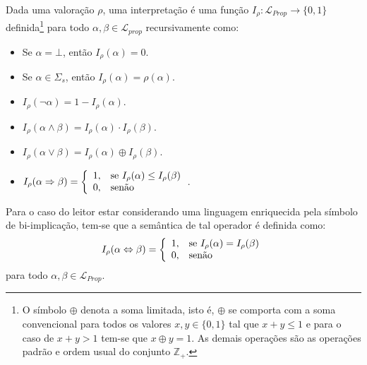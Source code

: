 \begin{definition}[Interpretação]\label{def:interpretacat}
   Dada uma valoração $\rho$, uma interpretação é uma função $I_\rho : \mathcal{L}_{Prop} \rightarrow \{0,1\}$ definida\footnote{O símbolo $\oplus$ denota a soma limitada, isto é, $\oplus$ se comporta com a soma convencional para todos os valores $x, y \in \{0,1\}$ tal que $x + y \leq 1$ e para o caso de $x + y > 1$ tem-se que $x \oplus y = 1$. As demais operações são as operações padrão e ordem usual do conjunto $\mathbb{Z}_+$.} para todo $\alpha, \beta \in \mathcal{L}_{prop}$ recursivamente como:
   \begin{itemize}
        \item Se $\alpha = \bot$, então $I_\rho(\alpha) = 0$.
        \item Se $\alpha \in \Sigma_s$, então $I_\rho(\alpha) = \rho(\alpha)$.
        \item $I_\rho(\neg \alpha) = 1 - I_\rho(\alpha)$.
        \item $I_\rho(\alpha \land \beta) = I_\rho(\alpha) \cdot I_\rho(\beta)$.
        \item $I_\rho(\alpha \lor \beta) = I_\rho(\alpha) \oplus I_\rho(\beta)$.
        \item $I_\rho(\alpha \Rightarrow \beta) = \left\{\begin{array}{rl}	1, & \hbox{se } I_\rho(\alpha) \leq I_\rho(\beta)\\	0,  & \hbox{senão}\end{array}\right.$.
   \end{itemize}
\end{definition}

\begin{rema}
    Para o caso do leitor estar considerando uma linguagem enriquecida pela símbolo de bi-implicação, tem-se que a semântica de tal operador é definida como:
    \begin{equation*}
        I_\rho(\alpha \Leftrightarrow \beta) = \left\{\begin{array}{rl}	1, & \hbox{se } I_\rho(\alpha) = I_\rho(\beta)\\	0,  & \hbox{senão}\end{array}\right.
    \end{equation*}
    para todo $\alpha, \beta \in \mathcal{L}_{Prop}$.
\end{rema}


